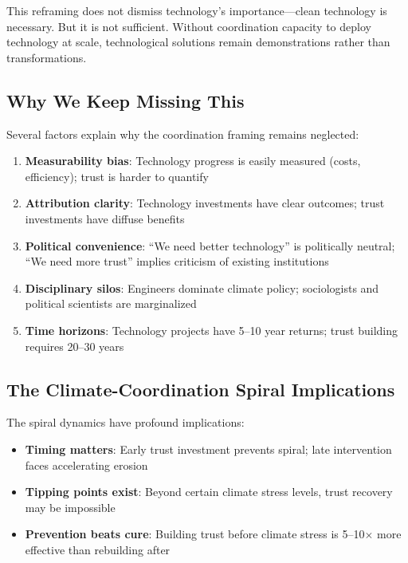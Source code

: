 \documentclass[12pt,a4paper]{article}
\begin{document}
This reframing does not dismiss technology's importance---clean technology is necessary. But it is not sufficient. Without coordination capacity to deploy technology at scale, technological solutions remain demonstrations rather than transformations.

\subsection{Why We Keep Missing This}

Several factors explain why the coordination framing remains neglected:

\begin{enumerate}
    \item \textbf{Measurability bias}: Technology progress is easily measured (costs, efficiency); trust is harder to quantify
    \item \textbf{Attribution clarity}: Technology investments have clear outcomes; trust investments have diffuse benefits
    \item \textbf{Political convenience}: ``We need better technology'' is politically neutral; ``We need more trust'' implies criticism of existing institutions
    \item \textbf{Disciplinary silos}: Engineers dominate climate policy; sociologists and political scientists are marginalized
    \item \textbf{Time horizons}: Technology projects have 5--10 year returns; trust building requires 20--30 years
\end{enumerate}

\subsection{The Climate-Coordination Spiral Implications}

The spiral dynamics have profound implications:

\begin{itemize}
    \item \textbf{Timing matters}: Early trust investment prevents spiral; late intervention faces accelerating erosion
    \item \textbf{Tipping points exist}: Beyond certain climate stress levels, trust recovery may be impossible
    \item \textbf{Prevention beats cure}: Building trust before climate stress is 5--10$\times$ more effective than rebuilding after
\end{itemize}
\end{document}

